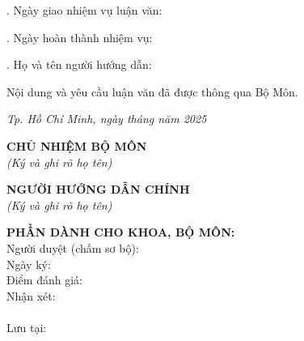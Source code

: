 \vspace{0.4cm}
. Ngày giao nhiệm vụ luận văn: \dotfill

\vspace{0.3cm}
. Ngày hoàn thành nhiệm vụ: \dotfill

\vspace{0.3cm}
. Họ và tên người hướng dẫn: \TENCANBO

\vspace{0.5cm}
\noindent
Nội dung và yêu cầu luận văn đã được thông qua Bộ Môn.

\vspace{0.4cm}
\noindent
\hfill \textit{Tp. Hồ Chí Minh, ngày \makebox[1.2cm]{\dotfill} tháng \makebox[1.2cm]{\dotfill} năm 2025}
\vspace{0.5cm}
\begin{center}
\begin{minipage}[t]{0.48\textwidth}
\centering
\textbf{CHỦ NHIỆM BỘ MÔN}\\
\textit{\small (Ký và ghi rõ họ tên)}\\[0.2cm]
\vspace*{2.5cm} %
\end{minipage}
\hfill
\begin{minipage}[t]{0.48\textwidth}
\centering
\textbf{NGƯỜI HƯỚNG DẪN CHÍNH}\\
\textit{\small (Ký và ghi rõ họ tên)}\\[0.2cm]
\vspace*{2.5cm} %
\end{minipage}
\end{center}


\vspace{0.3cm}
\noindent
\begin{minipage}[t]{\textwidth}
\textbf{PHẦN DÀNH CHO KHOA, BỘ MÔN:}\\[0.3cm]
\small
Người duyệt (chấm sơ bộ): \dotfill \\[0.2cm]
Ngày ký: \dotfill \\[0.2cm]
Điểm đánh giá: \dotfill \\[0.2cm]
Nhận xét: \dotfill \\[0.2cm]
\phantom{Nhận xét: } \dotfill \\[0.2cm]
Lưu tại: \dotfill
\end{minipage}
